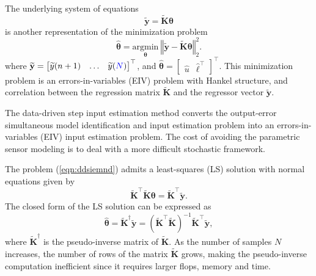 The underlying system of equations 
\begin{equation} \widetilde{\mathbf{y}} = \widetilde{\mathbf{K}} \bm{\theta} \label{eqn:ddsiemnd} \end{equation}
is another representation of the minimization problem
\begin{equation} \widehat{\bm{\theta}} = \underset{\bm{\theta}}{\mathrm{argmin}} \ \left\Vert  \widetilde{\mathbf{y}} - \widetilde{\mathbf{K}} \bm{\theta} \right\Vert^2_2 . \label{eqn:min_seiv} \end{equation}
where $\widetilde{\mathbf{y}} = \begin{bmatrix} \widetilde{y}(n+1) & \ldots & \widetilde{y}(\color{blue}N\color{black}) \end{bmatrix}^\top$, and
$\widehat{\bm{\theta}} = \begin{bmatrix} \widehat{{u}} & \widehat{\bm{\ell}}^\top \end{bmatrix}^\top$. 
This minimization problem is an errors-in-variables (EIV) problem with Hankel structure, and correlation between the regression matrix $\widetilde{\mathbf{K}}$ and the regressor vector $\widetilde{\mathbf{y}}$.

The data-driven step input estimation method converts the output-error simultaneous model identification and input estimation problem into an errors-in-variables (EIV) input estimation problem.
The cost of avoiding the parametric sensor modeling is to deal with a more difficult stochastic framework.


The problem (\ref{eqn:ddsiemnd}) admits a least-squares (LS) solution \color{blue} with normal equations given by
\begin{equation} \widetilde{\mathbf{K}}^\top \widetilde{\mathbf{K}} \bm{\theta} = \widetilde{\mathbf{K}}^\top \widetilde{\mathbf{y}}.  \label{eqn:neq_seiv} \end{equation} 
The closed form of the LS solution can be expressed as
\begin{equation} \widehat{\bm{\theta}} = \widetilde{\mathbf{K}}^\dagger \widetilde{\mathbf{y}} = ( \widetilde{\mathbf{K}}^\top \widetilde{\mathbf{K}} )^{-1} \widetilde{\mathbf{K}}^\top \widetilde{\mathbf{y}} , \label{eqn:xhat} \end{equation}
where $\widetilde{\mathbf{K}}^\dagger$ is the pseudo-inverse matrix of $\widetilde{\mathbf{K}}$.
As the number of samples $N$ increases, the number of rows of the matrix $\widetilde{\mathbf{K}}$ grows, making the pseudo-inverse computation inefficient since it requires larger flops, memory and time.

